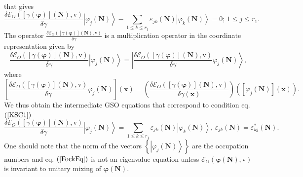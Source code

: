 \documentclass[aps,preprint]{revtex4}%
\begin{document}
that gives%
\begin{equation}
\frac{\delta\mathcal{E}_{O}\left(  \left[  \gamma\left(  \boldsymbol{\varphi
}\right)  \right]  \boldsymbol{\left(  \boldsymbol{N}\right)  ,}%
\mathrm{v}\right)  }{\delta\gamma}\left\vert \varphi_{j}\left(  \boldsymbol{N}%
\right)  \right\rangle -\sum_{1\leq k\leq r_{1}}\varepsilon_{jk}\left(
\boldsymbol{N}\right)  \left\vert \varphi_{k}\left(  \boldsymbol{N}\right)
\right\rangle =0;\,1\leq j\leq r_{1}.
\end{equation}
The operator $\frac{\delta\mathcal{E}_{O}\left(  \left[  \gamma\left(
\boldsymbol{\varphi}\right)  \right]  \boldsymbol{\left(  \boldsymbol{N}%
\right)  ,}\mathrm{v}\right)  }{\delta\gamma}$ is a multiplication operator in
the coordinate representation given by
\begin{equation}
\frac{\delta\mathcal{E}_{O}\left(  \left[  \gamma\left(  \boldsymbol{\varphi
}\right)  \right]  \boldsymbol{\left(  \boldsymbol{N}\right)  ,}%
\mathrm{v}\right)  }{\delta\gamma}\left\vert \varphi_{j}\left(  \boldsymbol{N}%
\right)  \right\rangle =\left\vert \frac{\delta\mathcal{E}_{O}\left(  \left[
\gamma\left(  \boldsymbol{\varphi}\right)  \right]  \boldsymbol{\left(
\boldsymbol{N}\right)  ,}\mathrm{v}\right)  }{\delta\gamma}\varphi_{j}\left(
\boldsymbol{N}\right)  \right\rangle ,
\end{equation}
where
\begin{equation}
\left[  \frac{\delta\mathcal{E}_{O}\left(  \left[  \gamma\left(
\boldsymbol{\varphi}\right)  \right]  \boldsymbol{\left(  \boldsymbol{N}%
\right)  ,}\mathrm{v}\right)  }{\delta\gamma}\varphi_{j}\left(  \boldsymbol{N}%
\right)  \right]  \left(  \boldsymbol{x}\right)  =\left(  \frac{\delta
\mathcal{E}_{O}\left(  \left[  \gamma\left(  \boldsymbol{\varphi}\right)
\right]  \boldsymbol{\left(  \boldsymbol{N}\right)  ,}\mathrm{v}\right)
}{\delta\gamma\left(  \boldsymbol{x}\right)  }\right)  \left(  \left[
\varphi_{j}\left(  \boldsymbol{N}\right)  \right]  \left(  \boldsymbol{x}%
\right)  \right)  .
\end{equation}
We thus obtain the intermediate GSO equations that correspond to condition eq.
$\left(  \ref{KSC1}\right)  $
\begin{equation}
\frac{\delta\mathcal{E}_{O}\left(  \left[  \gamma\left(  \boldsymbol{\varphi
}\right)  \right]  \boldsymbol{\left(  \boldsymbol{N}\right)  ,}%
\mathrm{v}\right)  }{\delta\gamma}\left\vert \varphi_{j}\left(  \boldsymbol{N}%
\right)  \right\rangle =\sum_{1\leq k\leq r_{1}}\varepsilon_{jk}\left(
\boldsymbol{N}\right)  \left\vert \varphi_{k}\left(  \boldsymbol{N}\right)
\right\rangle ,\,\varepsilon_{jk}\left(  \boldsymbol{N}\right)  =\varepsilon
_{kj}^{\ast}\left(  \boldsymbol{N}\right)  . \label{FockEq}%
\end{equation}
One should note that the norm of the vectors $\left\{  \left\vert \varphi
_{j}\left(  \boldsymbol{N}\right)  \right\rangle \right\}  $ are the
occupation numbers and eq. $\left(  \ref{FockEq}\right)  $ is not an
eigenvalue equation unless $\mathcal{E}_{O}\left(  \boldsymbol{\varphi}\left(
\boldsymbol{N}\right)  ,\mathrm{v}\right)  $ is invariant to unitary mixing of
$\boldsymbol{\varphi}\left(  \boldsymbol{N}\right)  $.
\end{document}
